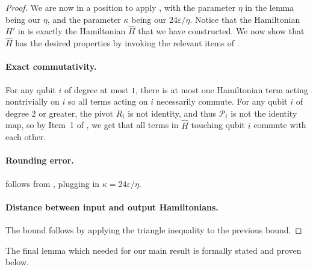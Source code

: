 \documentclass[11pt]{article}
\theoremstyle{plain}
\newcommand{\eps}{\varepsilon}
\renewcommand{\cP}{\mathcal{P}}
\begin{document}
\begin{proof}
We are now in a position to apply , with the parameter $\eta$ in the lemma being our $\eta$, and the parameter $\kappa$ being our $24\eps/\eta$. Notice that the Hamiltonian $H'$ in 
 is exactly the Hamiltonian $\hat{H}$ that we have constructed. We now show that $\hat{H}$ has the desired properties by invoking the relevant items of .
 
\paragraph{Exact commutativity.} For any qubit $i$ of degree at most $1$, there is at most  one Hamiltonian term acting nontrivially on $i$ so all terms acting on $i$ necessarily commute. For any qubit $i$ of degree $2$ or greater, the pivot $R_i$ is not identity, and thus $\cP_i$ is not the identity map, so by Item~1 of , we get that all terms in $\hat{H}$ touching qubit $i$ commute with each other.

\paragraph{Rounding error.}  follows from , plugging in $\kappa = 24\eps/\eta$. 

\paragraph{Distance between input and output Hamiltonians.}
The bound  follows by applying the triangle inequality to the previous bound.

\end{proof}

The final lemma which needed for our main result is formally stated and proven below.
\end{document}
